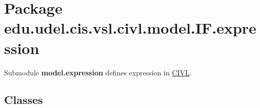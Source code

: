 \hypertarget{namespaceedu_1_1udel_1_1cis_1_1vsl_1_1civl_1_1model_1_1IF_1_1expression}{}\section{Package edu.\+udel.\+cis.\+vsl.\+civl.\+model.\+I\+F.\+expression}
\label{namespaceedu_1_1udel_1_1cis_1_1vsl_1_1civl_1_1model_1_1IF_1_1expression}


Submodule {\bfseries model.\+expression} defines expression in \hyperlink{classedu_1_1udel_1_1cis_1_1vsl_1_1civl_1_1CIVL}{C\+I\+V\+L}.  


\subsection*{Classes}
